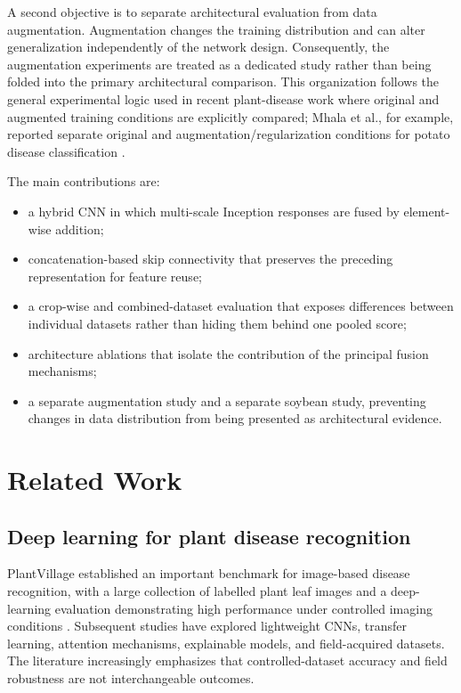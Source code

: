 \documentclass[a4paper,fleqn]{cas-dc}
\begin{document}
A second objective is to separate architectural evaluation from data augmentation. Augmentation changes the training distribution and can alter generalization independently of the network design. Consequently, the augmentation experiments are treated as a dedicated study rather than being folded into the primary architectural comparison. This organization follows the general experimental logic used in recent plant-disease work where original and augmented training conditions are explicitly compared; Mhala et al., for example, reported separate original and augmentation/regularization conditions for potato disease classification \cite{mhala2025}.

The main contributions are:
\begin{itemize}[leftmargin=*]
\item a hybrid CNN in which multi-scale Inception responses are fused by element-wise addition;
\item concatenation-based skip connectivity that preserves the preceding representation for feature reuse;
\item a crop-wise and combined-dataset evaluation that exposes differences between individual datasets rather than hiding them behind one pooled score;
\item architecture ablations that isolate the contribution of the principal fusion mechanisms;
\item a separate augmentation study and a separate soybean study, preventing changes in data distribution from being presented as architectural evidence.
\end{itemize}

\section{Related Work}
\subsection{Deep learning for plant disease recognition}
PlantVillage established an important benchmark for image-based disease recognition, with a large collection of labelled plant leaf images and a deep-learning evaluation demonstrating high performance under controlled imaging conditions \cite{mohanty2016}. Subsequent studies have explored lightweight CNNs, transfer learning, attention mechanisms, explainable models, and field-acquired datasets. The literature increasingly emphasizes that controlled-dataset accuracy and field robustness are not interchangeable outcomes.
\end{document}
